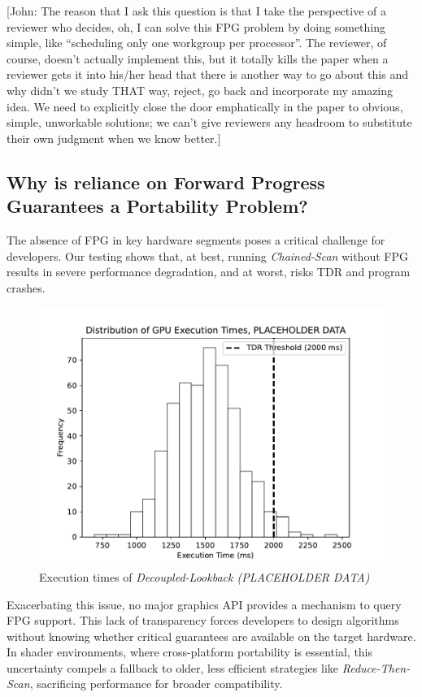 \documentclass[sigconf]{acmart}
\newcommand{\john}[1]{{\footnotesize\color{cyan}[John: #1]}}
\begin{document}
\john{The reason that I ask this question is that I take the perspective of a reviewer who decides, oh, I can solve this FPG problem by doing something simple, like ``scheduling only one workgroup per processor''. The reviewer, of course, doesn't actually implement this, but it totally kills the paper when a reviewer gets it into his/her head that there is another way to go about this and why didn't we study THAT way, reject, go back and incorporate my amazing idea. We need to explicitly close the door emphatically in the paper to obvious, simple, unworkable solutions; we can't give reviewers any headroom to substitute their own judgment when we know better.}

\subsection{Why is reliance on Forward Progress Guarantees a Portability Problem?}
The absence of FPG in key hardware segments poses a critical challenge for developers. Our testing shows that, at best, running \emph{Chained-Scan} without FPG results in severe performance degradation, and at worst, risks TDR and program crashes.
\begin{figure}
  \centering
  \includegraphics[width=\linewidth]{graphics/Figure_1.pdf}
  \caption{Execution times of \emph{Decoupled-Lookback (PLACEHOLDER DATA)}}
\end{figure}
Exacerbating this issue, no major graphics API provides a mechanism to query FPG support. This lack of transparency forces developers to design algorithms without knowing whether critical guarantees are available on the target hardware. In shader environments, where cross-platform portability is essential, this uncertainty compels a fallback to older, less efficient strategies like \emph{Reduce-Then-Scan}, sacrificing performance for broader compatibility.
\end{document}
